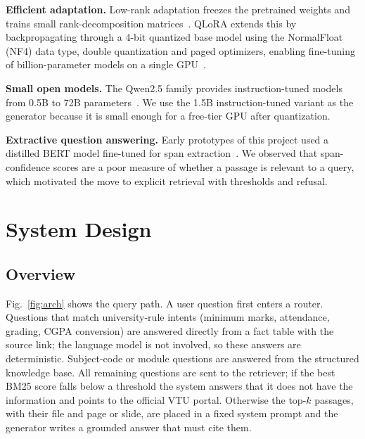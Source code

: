 \documentclass[conference]{IEEEtran}
\begin{document}
\textbf{Efficient adaptation.} Low-rank adaptation freezes the pretrained weights and trains small rank-decomposition matrices~\cite{hu2022lora}. QLoRA extends this by backpropagating through a 4-bit quantized base model using the NormalFloat (NF4) data type, double quantization and paged optimizers, enabling fine-tuning of billion-parameter models on a single GPU~\cite{dettmers2023qlora}.

\textbf{Small open models.} The Qwen2.5 family provides instruction-tuned models from 0.5B to 72B parameters~\cite{qwen2025}. We use the 1.5B instruction-tuned variant as the generator because it is small enough for a free-tier GPU after quantization.

\textbf{Extractive question answering.} Early prototypes of this project used a distilled BERT model fine-tuned for span extraction~\cite{sanh2019distilbert}. We observed that span-confidence scores are a poor measure of whether a passage is relevant to a query, which motivated the move to explicit retrieval with thresholds and refusal.

\section{System Design}
\subsection{Overview}
Fig.~\ref{fig:arch} shows the query path. A user question first enters a router. Questions that match university-rule intents (minimum marks, attendance, grading, CGPA conversion) are answered directly from a fact table with the source link; the language model is not involved, so these answers are deterministic. Subject-code or module questions are answered from the structured knowledge base. All remaining questions are sent to the retriever; if the best BM25 score falls below a threshold the system answers that it does not have the information and points to the official VTU portal. Otherwise the top-$k$ passages, with their file and page or slide, are placed in a fixed system prompt and the generator writes a grounded answer that must cite them.
\end{document}
